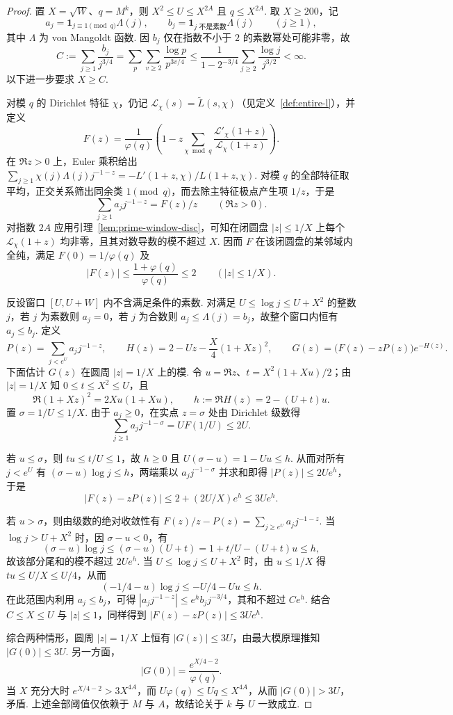 \begin{proof}
置 $X=\sqrt W$、$q=M^k$，则 $X^2\le U\le X^{2A}$ 且 $q\le X^{2A}$. 取 $X\ge200$，记
\[
 a_j=\mathbf1_{j\equiv1\pmod q}\Lambda(j),\qquad
 b_j=\mathbf1_{j\text{ 不是素数}}\Lambda(j)
 \qquad(j\ge1),
\]
其中 $\Lambda$ 为 von Mangoldt 函数. 因 $b_j$ 仅在指数不小于 $2$ 的素数幂处可能非零，故
\[
 C:=\sum_{j\ge1}\frac{b_j}{j^{3/4}}
   =\sum_p\sum_{v\ge2}\frac{\log p}{p^{3v/4}}
   \le\frac{1}{1-2^{-3/4}}\sum_{j\ge2}\frac{\log j}{j^{3/2}}
   <\infty .
\]
以下进一步要求 $X\ge C$.

对模 $q$ 的 Dirichlet 特征 $\chi$，仍记 $\mathcal L_\chi(s)=\widetilde L(s,\chi)$（见定义~\ref{def:entire-l}），并定义
\[
 F(z)=\frac{1}{\varphi(q)}
      \left(1-z\sum_{\chi\bmod q}
        \frac{\mathcal L'_\chi(1+z)}{\mathcal L_\chi(1+z)}\right).
\]
在 $\Re z>0$ 上，Euler 乘积给出 $\sum_{j\ge1}\chi(j)\Lambda(j)j^{-1-z}=-L'(1+z,\chi)/L(1+z,\chi)$.
对模 $q$ 的全部特征取平均，正交关系筛出同余类 $1\pmod q$，而去除主特征极点产生项 $1/z$，于是
\[
 \sum_{j\ge1}a_j j^{-1-z}=F(z)/z \qquad(\Re z>0).
\]
对指数 $2A$ 应用引理~\ref{lem:prime-window-disc}，可知在闭圆盘 $|z|\le1/X$ 上每个 $\mathcal L_\chi(1+z)$ 均非零，且其对数导数的模不超过 $X$. 因而 $F$ 在该闭圆盘的某邻域内全纯，满足 $F(0)=1/\varphi(q)$ 及
\[
 |F(z)|\le\frac{1+\varphi(q)}{\varphi(q)}\le2
 \qquad (|z|\le1/X).
\]

反设窗口 $[U,U+W]$ 内不含满足条件的素数. 对满足 $U\le\log j\le U+X^2$ 的整数 $j$，若 $j$ 为素数则 $a_j=0$，若 $j$ 为合数则 $a_j\le\Lambda(j)=b_j$，故整个窗口内恒有 $a_j\le b_j$. 定义
\[
 P(z)=\sum_{j<e^U}a_j j^{-1-z},\qquad
 H(z)=2-Uz-\frac X4(1+Xz)^2,\qquad
 G(z)=\bigl(F(z)-zP(z)\bigr)e^{-H(z)}.
\]
下面估计 $G(z)$ 在圆周 $|z|=1/X$ 上的模.
令 $u=\Re z$、$t=X^2(1+Xu)/2$；由 $|z|=1/X$ 知 $0\le t\le X^2\le U$，且
\[
 \Re(1+Xz)^2=2Xu(1+Xu),\qquad
 h:=\Re H(z)=2-(U+t)u .
\]
置 $\sigma=1/U\le1/X$. 由于 $a_j\ge0$，在实点 $z=\sigma$ 处由 Dirichlet 级数得
\[
 \sum_{j\ge1} a_j j^{-1-\sigma}
   =U F(1/U)\le2U .
\]

若 $u\le\sigma$，则 $t u\le t/U\le1$，故 $h\ge0$ 且
$U(\sigma-u)=1-Uu\le h$. 从而对所有 $j<e^U$ 有 $(\sigma-u)\log j\le h$，两端乘以 $a_j j^{-1-\sigma}$ 并求和即得 $|P(z)|\le2Ue^h$，于是
\[
 |F(z)-zP(z)|\le 2+(2U/X)e^h\le3Ue^h.
\]

若 $u>\sigma$，则由级数的绝对收敛性有
$F(z)/z-P(z)=\sum_{j\ge e^U}a_j j^{-1-z}$. 当 $\log j>U+X^2$ 时，因 $\sigma-u<0$，有
\[
 (\sigma-u)\log j\le(\sigma-u)(U+t)
 =1+t/U-(U+t)u\le h,
\]
故该部分尾和的模不超过 $2Ue^h$. 当 $U\le\log j\le U+X^2$ 时，由 $u\le1/X$ 得 $tu\le U/X\le U/4$，从而
\[
 (-1/4-u)\log j\le -U/4-Uu\le h.
\]
在此范围内利用 $a_j\le b_j$，可得 $|a_j j^{-1-z}|\le e^h b_jj^{-3/4}$，其和不超过 $Ce^h$.
结合 $C\le X\le U$ 与 $|z|\le1$，同样得到 $|F(z)-zP(z)|\le3Ue^h$.

综合两种情形，圆周 $|z|=1/X$ 上恒有 $|G(z)|\le3U$，由最大模原理推知 $|G(0)|\le3U$. 另一方面，
\[
 |G(0)|=\frac{e^{X/4-2}}{\varphi(q)}.
\]
当 $X$ 充分大时 $e^{X/4-2}>3X^{4A}$，而 $U\varphi(q)\le Uq\le X^{4A}$，从而 $|G(0)|>3U$，矛盾. 上述全部阈值仅依赖于 $M$ 与 $A$，故结论关于 $k$ 与 $U$ 一致成立.
\end{proof}

